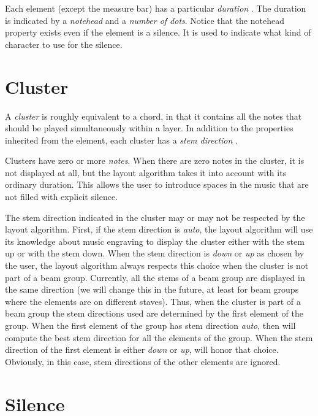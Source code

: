Each element (except the measure bar) has a particular \emph{duration}
.  The duration is indicated by a \emph{notehead}
 and a \emph{number of dots}. 
 Notice that the notehead property exists even
if the element is a silence.  It is used to indicate what kind of
character to use for the silence.


\section{Cluster}

A \emph{cluster} is roughly equivalent to a chord, in
that it contains all the notes that should be played simultaneously
within a layer.  In addition to the properties inherited from the
element, each cluster has a \emph{stem direction}  .

Clusters have zero or more \emph{notes}.  When there are zero notes in
the cluster, it is not displayed at all, but the layout algorithm
takes it into account with its ordinary duration.  This allows the
user to introduce spaces in the music that are not filled with
explicit silence. 

The stem direction indicated in the cluster may or may not be
respected by the layout algorithm.  First, if the stem direction is
\emph{auto}, the layout algorithm will use its knowledge about music
engraving to display the cluster either with the stem up or with the
stem down.  When the stem direction is \emph{down} or \emph{up} as
chosen by the user, the layout algorithm always respects this choice
when the cluster is not part of a beam group.  Currently, all the
stems of a beam group are displayed in the same direction (we will
change this in the future, at least for beam groups where the elements
are on different staves).  Thus, when the cluster is part of a beam
group the stem directions used are determined by the first element of
the group.  When the first element of the group has stem direction
\emph{auto}, then {\gs} will compute the best stem direction for all
the elements of the group.  When the stem direction of the first
element is either \emph{down} or \emph{up}, {\gs} will honor that
choice.  Obviously, in this case, stem directions of the other
elements are ignored. 

\section{Silence}

